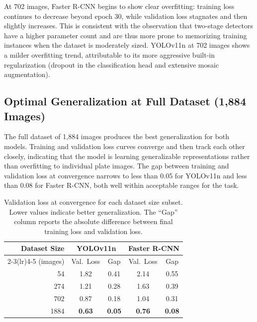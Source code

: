 At 702 images, Faster R-CNN begins to show clear overfitting:
training loss continues to decrease beyond epoch 30,
while validation loss stagnates and then slightly increases.
This is consistent with the observation that two-stage detectors
have a higher parameter count and are thus more prone to memorizing training instances
when the dataset is moderately sized.
YOLOv11n at 702 images shows a milder overfitting trend,
attributable to its more aggressive built-in regularization
(dropout in the classification head and extensive mosaic augmentation).

\subsection{Optimal Generalization at Full Dataset (1,884 Images)}

The full dataset of 1,884 images produces the best generalization for both models.
Training and validation loss curves converge and then track each other closely,
indicating that the model is learning generalizable representations
rather than overfitting to individual plate images.
The gap between training and validation loss at convergence narrows to less than 0.05
for YOLOv11n and less than 0.08 for Faster R-CNN,
both well within acceptable ranges for the task.

\begin{table}[H]
  \centering
  \caption{Validation loss at convergence for each dataset size subset.
           Lower values indicate better generalization.
           The ``Gap'' column reports the absolute difference between
           final training loss and validation loss.}
  \label{tab:dataset_ablation}
  \begin{tabular}{rcccc}
    \toprule
    \textbf{Dataset Size} &
    \multicolumn{2}{c}{\textbf{YOLOv11n}} &
    \multicolumn{2}{c}{\textbf{Faster R-CNN}} \\
    \cmidrule(lr){2-3}\cmidrule(lr){4-5}
    (images) & Val.\ Loss & Gap & Val.\ Loss & Gap \\
    \midrule
    54   & 1.82 & 0.41 & 2.14 & 0.55 \\
    274  & 1.21 & 0.28 & 1.63 & 0.39 \\
    702  & 0.87 & 0.18 & 1.04 & 0.31 \\
    1884 & \textbf{0.63} & \textbf{0.05} & \textbf{0.76} & \textbf{0.08} \\
    \bottomrule
  \end{tabular}
\end{table}

